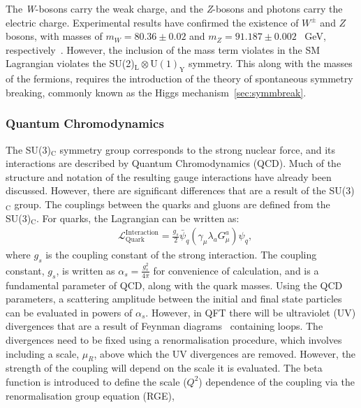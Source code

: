 The \emph{W}-bosons carry the weak charge, and the \emph{Z}-bosons and photons carry the electric charge. Experimental results have confirmed the existence of $W^\pm$ and $Z$ bosons, with masses of $m_W = 80.36 \pm 0.02$ and $m_Z = 91.187 \pm 0.002$ \SI{}{\giga\electronvolt}, respectively~\cite{PDG}. However, the inclusion of the mass term violates in the SM Lagrangian violates the SU(2)$_\mathrm{L} \otimes \mathrm{U(1)}_\mathrm{Y}$ symmetry. This along with the masses of the fermions, requires the introduction of the theory of spontaneous symmetry breaking, commonly known as the Higgs mechanism~\cref{sec:symmbreak}.

\subsubsection{Quantum Chromodynamics}
The SU(3)$_\mathrm{C}$ symmetry group corresponds to the strong nuclear force, and its interactions are described by Quantum Chromodynamics (QCD). Much of the structure and notation of the resulting gauge interactions have already been discussed. However, there are significant differences that are a result of the SU(3)$_\mathrm{C}$ group. The couplings between the quarks and gluons are defined from the SU(3)$_\mathrm{C}$. For quarks, the Lagrangian can be written as: 
\begin{equation}
    \label{eq:lagrangianQuark}
    \begin{aligned}
        & \mathcal{L}_\mathrm{Quark}^\mathrm{Interaction} = \frac{g_s}{2}\bar{\psi}_q \left(\gamma_\mu \lambda_a G_\mu^a \right)\psi_q ,
     \end{aligned}
\end{equation}
where $g_s$ is the coupling constant of the strong interaction. The coupling constant, $g_s$, is written as $\alpha_s = \frac{g_s^2}{4\pi}$ for convenience of calculation, and is a fundamental parameter of QCD, along with the quark masses. Using the QCD parameters, a scattering amplitude between the initial and final state particles can be evaluated in powers of $\alpha_s$. However, in QFT there will be ultraviolet (UV) divergences that are a result of Feynman diagrams~\cite{Thomson:2013zua} containing loops. The divergences need to be fixed using a renormalisation procedure, which involves including a scale, $\mu_R$, above which the UV divergences are removed. However, the strength of the coupling will depend on the scale it is evaluated. The beta function is introduced to define the scale ($Q^2$) dependence of the coupling via the renormalisation group equation (RGE),
